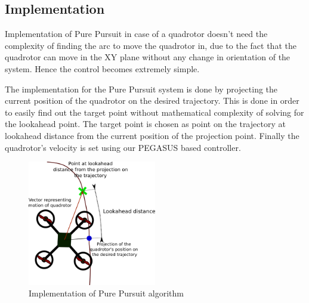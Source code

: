 \documentclass[hidelinks,BTech]{iitmdiss}
\begin{document}
\subsection*{Implementation}
Implementation of Pure Pursuit in case of a quadrotor doesn't need the complexity of finding the arc to move the quadrotor in, due to the fact that the quadrotor can move in the XY plane without any change in orientation of the system. Hence the control becomes extremely simple.

The implementation for the Pure Pursuit system is done by projecting the current position of the quadrotor on the desired trajectory. This is done in order to easily find out the target point without mathematical complexity of solving for the lookahead point. The target point is chosen as point on the trajectory at lookahead distance from the current position of the projection point. Finally the quadrotor's velocity is set using our PEGASUS based controller.
\begin{figure}[H]
  \centering
    \includegraphics[width=0.5\textwidth]{Pure_Pursuit_implementation.png}
    \caption{Implementation of Pure Pursuit algorithm}
\end{figure}
\end{document}
